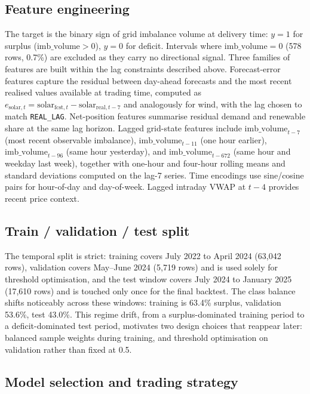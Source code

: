 \documentclass{article}
\begin{document}
\subsection{Feature engineering}

The target is the binary sign of grid imbalance volume at delivery time: $y = 1$ for surplus ($\text{imb\_volume} > 0$), $y = 0$ for deficit. Intervals where $\text{imb\_volume} = 0$ (578 rows, 0.7\%) are excluded as they carry no directional signal. Three families of features are built within the lag constraints described above. Forecast-error features capture the residual between day-ahead forecasts and the most recent realised values available at trading time, computed as $e_{\text{solar},t} = \text{solar}_{\text{fcst},t} - \text{solar}_{\text{real},t-7}$ and analogously for wind, with the lag chosen to match \texttt{REAL\_LAG}. Net-position features summarise residual demand and renewable share at the same lag horizon. Lagged grid-state features include $\text{imb\_volume}_{t-7}$ (most recent observable imbalance), $\text{imb\_volume}_{t-11}$ (one hour earlier), $\text{imb\_volume}_{t-96}$ (same hour yesterday), and $\text{imb\_volume}_{t-672}$ (same hour and weekday last week), together with one-hour and four-hour rolling means and standard deviations computed on the lag-7 series. Time encodings use sine/cosine pairs for hour-of-day and day-of-week. Lagged intraday VWAP at $t-4$ provides recent price context.

\subsection{Train / validation / test split}

The temporal split is strict: training covers July 2022 to April 2024 (63{,}042 rows), validation covers May--June 2024 (5{,}719 rows) and is used solely for threshold optimisation, and the test window covers July 2024 to January 2025 (17{,}610 rows) and is touched only once for the final backtest. The class balance shifts noticeably across these windows: training is 63.4\% surplus, validation 53.6\%, test 43.0\%. This regime drift, from a surplus-dominated training period to a deficit-dominated test period, motivates two design choices that reappear later: balanced sample weights during training, and threshold optimisation on validation rather than fixed at 0.5.

\subsection{Model selection and trading strategy}
\end{document}
